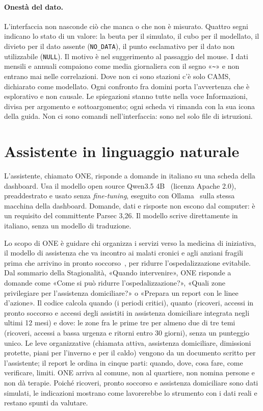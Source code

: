\paragraph{Onestà del dato.} L'interfaccia non nasconde ciò che manca o che non è misurato. Quattro segni indicano lo stato di un valore: la beuta per il simulato, il cubo per il modellato, il divieto per il dato assente (\texttt{NO\_DATA}), il punto esclamativo per il dato non utilizzabile (\texttt{NULL}). Il motivo è nel suggerimento al passaggio del mouse. I dati mensili e annuali compaiono come media giornaliera con il segno «\texttt{\textasciitilde}» e non entrano mai nelle correlazioni. Dove non ci sono stazioni c'è solo CAMS, dichiarato come modellato. Ogni confronto fra domini porta l'avvertenza che è esplorativo e non causale. Le spiegazioni stanno tutte nella voce Informazioni, divisa per argomento e sottoargomento; ogni scheda vi rimanda con la sua icona della guida. Non ci sono comandi nell'interfaccia: sono nel solo file di istruzioni.

\section{Assistente in linguaggio naturale}
\label{sec:impl-assistente}

L'assistente, chiamato ONE, risponde a domande in italiano su una scheda della dashboard. Usa il modello open source Qwen3.5 4B~\cite{qwen35_4b} (licenza Apache 2.0), preaddestrato e usato senza \emph{fine-tuning}, eseguito con Ollama~\cite{ollama} sulla stessa macchina della dashboard. Domande, dati e risposte non escono dal computer: è un requisito del committente Parsec 3,26. Il modello scrive direttamente in italiano, senza un modello di traduzione.

Lo scopo di ONE è guidare chi organizza i servizi verso la medicina di iniziativa, il modello di assistenza che va incontro ai malati cronici e agli anziani fragili prima che arrivino in pronto soccorso~\cite{piano_cronicita_2016,dm_77_2022}, per ridurre l'ospedalizzazione evitabile. Dal sommario della Stagionalità, «Quando intervenire», ONE risponde a domande come «Come si può ridurre l'ospedalizzazione?», «Quali zone privilegiare per l'assistenza domiciliare?» o «Prepara un report con le linee d'azione». Il codice calcola quando (i periodi critici), quanto (ricoveri, accessi in pronto soccorso e accessi degli assistiti in assistenza domiciliare integrata negli ultimi 12 mesi) e dove: le zone fra le prime tre per almeno due di tre temi (ricoveri, accessi a bassa urgenza e ritorni entro 30 giorni), senza un punteggio unico. Le leve organizzative (chiamata attiva, assistenza domiciliare, dimissioni protette, piani per l'inverno e per il caldo) vengono da un documento scritto per l'assistente; il report le ordina in cinque parti: quando, dove, cosa fare, come verificare, limiti. ONE arriva al comune, non al quartiere, non nomina persone e non dà terapie. Poiché ricoveri, pronto soccorso e assistenza domiciliare sono dati simulati, le indicazioni mostrano come lavorerebbe lo strumento con i dati reali e restano spunti da valutare.

